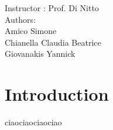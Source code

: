 \documentclass[11pt]{article}
\begin{document}
	 \begin{center}
	 	{\Large Instructor : Prof. Di Nitto}
	 	\vspace{5mm}\\	 
	 	{\Large Authors:}\\
	 	{\Large Amico Simone}\\
	 	{\Large Chianella Claudia Beatrice}\\
	 	{\Large Giovanakis Yannick}
	 \end{center}
	 
	 \newpage
	 
	 \tableofcontents{}
	 
	 \newpage
	 \section{\Large Introduction}
	 	ciaociaociaociao
	
	 
     
    
     
	
\end{document}
